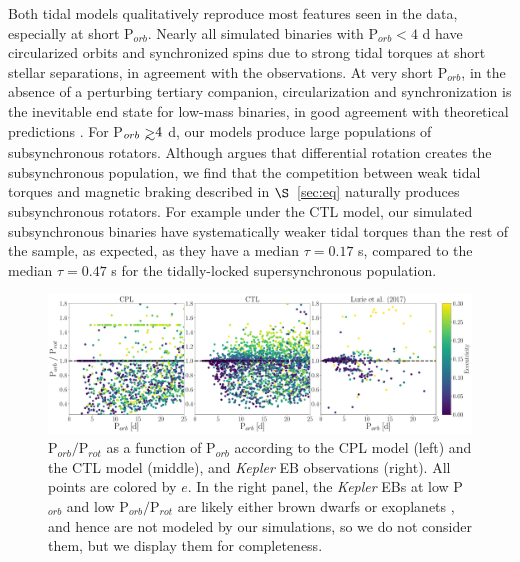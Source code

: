 \documentclass[twocolumn]{aastex61}
\def\gsim{~\rlap{$>$}{\lower 1.0ex\hbox{$\sim$}}}
\newcommand{\kepler}[0]{\textit{Kepler}\xspace}
\begin{document}
Both tidal models qualitatively reproduce most features seen in the \citet{Lurie2017} data, especially at short P$_{orb}$. Nearly all simulated binaries with P$_{orb} < 4$ d have circularized orbits and synchronized spins due to strong tidal torques at short stellar separations, in agreement with the \citet{Lurie2017} observations. At very short P$_{orb}$, in the absence of a perturbing tertiary companion, circularization and synchronization is the inevitable end state for low-mass binaries, in good agreement with theoretical predictions \citep{Counselman1973}. For P$_{orb} \gsim 4$ d, our models produce large populations of subsynchronous rotators. Although \citet{Lurie2017} argues that differential rotation creates the subsynchronous population, we find that the competition between weak tidal torques and magnetic braking described in $\S$~\ref{sec:eq} naturally produces subsynchronous rotators.  For example under the CTL model, our simulated subsynchronous binaries have systematically weaker tidal torques than the rest of the sample, as expected, as they have a median $\tau = 0.17$ s, compared to the median $\tau = 0.47$ s for the tidally-locked supersynchronous population.  
\begin{figure}[t]
	\includegraphics[width=\textwidth]{../Plots/lurieFig7.pdf}
   \caption{P$_{orb}/$P$_{rot}$ as a function of P$_{orb}$ according to the CPL model (left) and the CTL model (middle), and \citet{Lurie2017} \kepler EB observations (right). All points are colored by $e$.  In the right panel, the \kepler EBs at low P$_{orb}$ and low P$_{orb}/$P$_{rot}$ are likely either brown dwarfs or exoplanets \citep{Lurie2017}, and hence are not modeled by our simulations, so we do not consider them, but we display them for completeness.}%
    \label{fig:lurie7}%
\end{figure}
\end{document}
